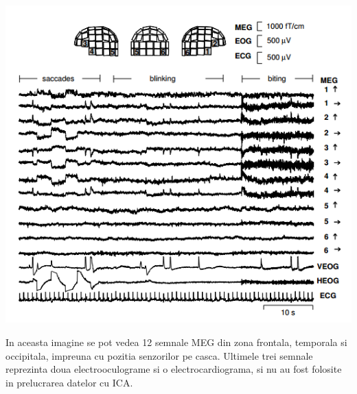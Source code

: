 \documentclass[12pt,oneside]{article}
\begin{document}
\begin{center}
	\includegraphics[scale=1]{meg_1}
 \end{center}
 In aceasta imagine se pot vedea 12 semnale MEG din zona frontala, temporala si occipitala, impreuna cu pozitia senzorilor pe casca. Ultimele trei semnale reprezinta doua electrooculograme si o electrocardiograma, si nu au fost folosite in prelucrarea datelor cu ICA.
\end{document}
